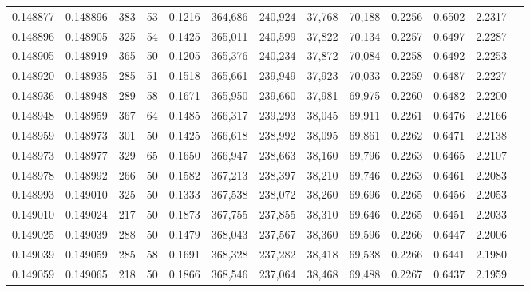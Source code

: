\begin{tabular}{rrrrrrrrrrrrr}
0.148877 & 0.148896 &   383 &  53 &                                     0.1216 & 364,686 & 240,924 &  37,768 &  70,188 & 0.2256 & 0.6502 & 2.2317 \\
0.148896 & 0.148905 &   325 &  54 &                                     0.1425 & 365,011 & 240,599 &  37,822 &  70,134 & 0.2257 & 0.6497 & 2.2287 \\
0.148905 & 0.148919 &   365 &  50 &                                     0.1205 & 365,376 & 240,234 &  37,872 &  70,084 & 0.2258 & 0.6492 & 2.2253 \\
0.148920 & 0.148935 &   285 &  51 &                                     0.1518 & 365,661 & 239,949 &  37,923 &  70,033 & 0.2259 & 0.6487 & 2.2227 \\
0.148936 & 0.148948 &   289 &  58 &                                     0.1671 & 365,950 & 239,660 &  37,981 &  69,975 & 0.2260 & 0.6482 & 2.2200 \\
0.148948 & 0.148959 &   367 &  64 &                                     0.1485 & 366,317 & 239,293 &  38,045 &  69,911 & 0.2261 & 0.6476 & 2.2166 \\
0.148959 & 0.148973 &   301 &  50 &                                     0.1425 & 366,618 & 238,992 &  38,095 &  69,861 & 0.2262 & 0.6471 & 2.2138 \\
0.148973 & 0.148977 &   329 &  65 &                                     0.1650 & 366,947 & 238,663 &  38,160 &  69,796 & 0.2263 & 0.6465 & 2.2107 \\
0.148978 & 0.148992 &   266 &  50 &                                     0.1582 & 367,213 & 238,397 &  38,210 &  69,746 & 0.2263 & 0.6461 & 2.2083 \\
0.148993 & 0.149010 &   325 &  50 &                                     0.1333 & 367,538 & 238,072 &  38,260 &  69,696 & 0.2265 & 0.6456 & 2.2053 \\
0.149010 & 0.149024 &   217 &  50 &                                     0.1873 & 367,755 & 237,855 &  38,310 &  69,646 & 0.2265 & 0.6451 & 2.2033 \\
0.149025 & 0.149039 &   288 &  50 &                                     0.1479 & 368,043 & 237,567 &  38,360 &  69,596 & 0.2266 & 0.6447 & 2.2006 \\
0.149039 & 0.149059 &   285 &  58 &                                     0.1691 & 368,328 & 237,282 &  38,418 &  69,538 & 0.2266 & 0.6441 & 2.1980 \\
0.149059 & 0.149065 &   218 &  50 &                                     0.1866 & 368,546 & 237,064 &  38,468 &  69,488 & 0.2267 & 0.6437 & 2.1959 \\

\end{tabular}
